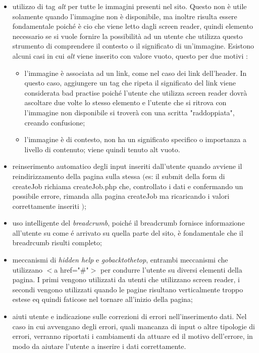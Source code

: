   \begin{itemize}
    \item utilizzo di tag \textit{alt} per tutte le immagini presenti nel sito. Questo non è utile solamente quando l'immagine non è disponibile, ma inoltre risulta essere fondamentale poiché è cio che viene letto dagli screen reader, quindi elemento necessario se si vuole fornire la possibilità ad un utente che utilizza questo strumento di comprendere il contesto o il significato di un'immagine.
        Esistono alcuni casi in cui \textit{alt} viene inserito con valore vuoto, questo per due motivi :
    \begin{itemize}
      \item l'immagine è associata ad un link, come nel caso dei link dell'header. In questo caso, aggiungere un tag che ripeta il significato del link viene considerata bad practise poiché l'utente che utilizza screen reader dovrà ascoltare due volte lo stesso elemento e l'utente che si ritrova con l'immagine non disponibile si troverà con una scritta "raddoppiata", creando confusione;
      \item l'immagine è di contesto, non ha un significato specifico o importanza a livello di contenuto; viene quindi tenuto alt vuoto.
    \end{itemize}
    \item reinserimento automatico degli input inseriti dall'utente quando avviene il reindirizzamento della pagina sulla stessa 
     $($es: il submit della form di createJob richiama createJob.php che, controllato i dati e confermando un possibile errore, rimanda alla pagina createJob ma ricaricando i valori correttamente inseriti $)$;
    \item uso intelligente del \textit{breadcrumb}, poiché il breadcrumb fornisce informazione all'utente su come é arrivato su quella parte del sito, è fondamentale che il breadrcumb risulti completo;
    \item meccanismi di \textit{hidden help} e \textit{gobacktothetop}, entrambi meccanismi che utilizzano $<$a href="\#"$>$ per condurre l'utente su diversi elementi della pagina. I primi vengono utilizzati da utenti che utilizzano screen reader, i secondi vengono utilizzati quando le pagine risultano verticalmente troppo estese eq quindi faticose nel tornare all'inizio della pagina;
    \item aiuti utente e indicazione sulle correzioni di errori nell'inserimento dati. Nel caso in cui avvengano degli errori, quali mancanza di input o altre tipologie di errori, verranno riportati i cambiamenti da attuare ed il motivo dell'errore, in modo da aiutare l'utente a inserire i dati correttamente.
  \end{itemize} 